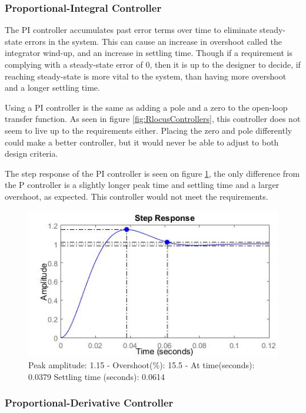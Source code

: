 \subsubsection{Proportional-Integral Controller}

The PI controller accumulates past error terms over time to eliminate steady-state errors in the system. This can cause an increase in overshoot called the integrator wind-up, and an increase in settling time. Though if a requirement is complying with a steady-state error of 0, then it is up to the designer to decide, if reaching steady-state is more vital to the system, than having more overshoot and a longer settling time.\par

Using a PI controller is the same as adding a pole and a zero to the open-loop transfer function. As seen in figure \ref{fig:RlocusControllers}, this controller does not seem to live up to the requirements either. Placing the zero and pole differently could make a better controller, but it would never be able to adjust to both design criteria.\par

The step response of the PI controller is seen on figure \ref{fig:PIStep}, the only difference from the P controller is a slightly longer peak time and settling time and a larger overshoot, as expected. This controller would not meet the requirements. 

\begin{figure}[h!]
\centering
\includegraphics[scale=0.7]{Billeder/PIStep.jpg}
\caption{ Peak amplitude: 1.15 - Overshoot(\%): 15.5 - At time(seconds): 0.0379
		 Settling time (seconds): 0.0614 }
\label{fig:PIStep}
\end{figure}

\subsubsection{Proportional-Derivative Controller}

